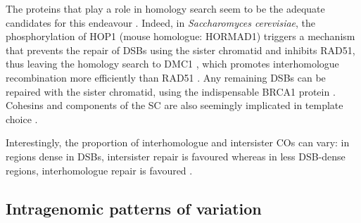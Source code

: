 The proteins that play a role in homology search seem to be the adequate candidates for this endeavour \citep[reviewed in][]{youds2011choice}.
Indeed, in \textit{Saccharomyces cerevisiae}, the phosphorylation of HOP1 (mouse homologue: HORMAD1) triggers a mechanism that prevents the repair of DSBs using the sister chromatid \citep{niu2005partner} and inhibits RAD51, thus leaving the homology search to DMC1 \citep{niu2009regulation}, which promotes interhomologue recombination more efficiently than RAD51 \citep{schwacha1997interhomolog}.
Any remaining DSBs can be repaired with the sister chromatid, using the indispensable BRCA1 protein \citep{adamo2008brc}.
Cohesins and components of the SC are also seemingly implicated in template choice \citep[reviewed in \citealp{pradillo2011template}]{couteau2004component,kim2010sister}.

Interestingly, the proportion of interhomologue and intersister COs can vary: in regions dense in DSBs, intersister repair is favoured whereas in less DSB-dense regions, interhomologue repair is favoured \citep{hyppa2010crossover}.





\subsection{Intragenomic patterns of variation}






%



